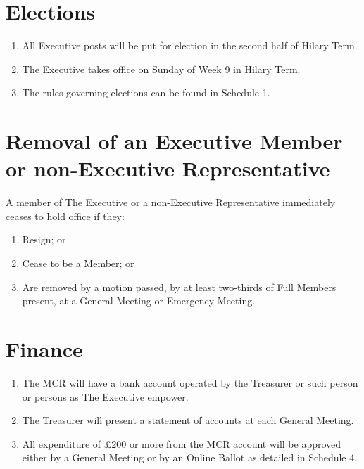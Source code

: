 \documentclass[11pt, a4paper]{article}
\begin{document}
\section{Elections}
\label{sec:elections}

\begin{enumerate}
    \item All Executive posts will be put for election in the second half of Hilary Term.
    \item The Executive takes office on Sunday of Week 9 in Hilary Term.
    \item The rules governing elections can be found in Schedule 1.
\end{enumerate}





\section{Removal of an Executive Member or non-Executive Representative}
\label{sec:removal_committee}

A member of The Executive or a non-Executive Representative immediately ceases to hold office if they:

\begin{enumerate}
    \item Resign; or
    \item Cease to be a Member; or
    \item Are removed by a motion passed, by at least two-thirds of Full Members present, at a General Meeting or Emergency Meeting.
\end{enumerate}





\section{Finance}
\label{sec:finance}

\begin{enumerate}
    \item The MCR will have a bank account operated by the Treasurer or such person or persons as The Executive empower.
    \item The Treasurer will present a statement of accounts at each General Meeting.
    \item All expenditure of \pounds200 or more from the MCR account will be approved either by a General Meeting or by an Online Ballot as detailed in Schedule 4.
\end{enumerate}
\end{document}
